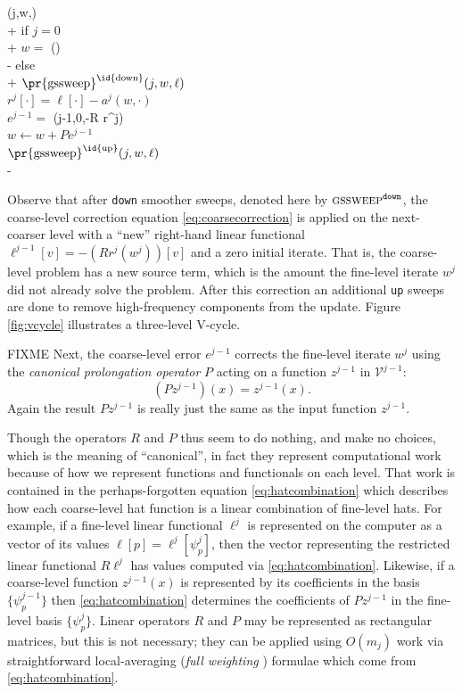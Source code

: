 \documentclass[letterpaper,final,12pt,reqno]{amsart}
\theoremstyle{claim}
\numberwithin{equation}{section}
\numberwithin{figure}{section}
\numberwithin{table}{section}
\begin{document}
\begin{pseudo*}
(j,w,\ell)\text{:} \\+
    if $j=0$ \\+
        $w =$ (\ell) \\-  %
    else \\+
        $\text{\pr{gssweep}}^{\text{\id{down}}}(j,w,\ell)$ \\
        $r^j[\cdot] = \ell[\cdot] - a^j(w,\cdot)$ \\
        $e^{j-1} =$ (j-1,0,-R r^j) \\
        $w \gets w + P e^{j-1}$ \\
        $\text{\pr{gssweep}}^{\text{\id{up}}}(j,w,\ell)$ \\-
\end{pseudo*}

Observe that after \texttt{down} smoother sweeps, denoted here by $\text{\textsc{gssweep}}^{\text{\texttt{down}}}$, the coarse-level correction equation \eqref{eq:coarsecorrection} is applied on the next-coarser level with a ``new'' right-hand linear functional $\ell^{j-1}[v]=-(R r^j(w^j))[v]$ and a zero initial iterate.  That is, the coarse-level problem has a new source term, which is the amount the fine-level iterate $w^j$ did not already solve the problem.  After this correction an additional \texttt{up} sweeps are done to remove high-frequency components from the update.  Figure \ref{fig:vcycle} illustrates a three-level V-cycle.

FIXME Next, the coarse-level error $e^{j-1}$ corrects the fine-level iterate $w^j$ using the \emph{canonical prolongation operator} $P$ acting on a function $z^{j-1}$ in $\mathcal{V}^{j-1}$:
\begin{equation}
  (P z^{j-1})(x) = z^{j-1}(x). \label{eq:canonicalprolongation}
\end{equation}
Again the result $P z^{j-1}$ is really just the same as the input function $z^{j-1}$.

Though the operators $R$ and $P$ thus seem to do nothing, and make no choices, which is the meaning of ``canonical'', in fact they represent computational work because of how we represent functions and functionals on each level.  That work is contained in the perhaps-forgotten equation \eqref{eq:hatcombination} which describes how each coarse-level hat function is a linear combination of fine-level hats.  For example, if a fine-level linear functional $\ell^j$ is represented on the computer as a vector of its values $\ell[p] = \ell^j[\psi_p^j]$, then the vector representing the restricted linear functional $R \ell^j$ has values computed via \eqref{eq:hatcombination}.  Likewise, if a coarse-level function $z^{j-1}(x)$ is represented by its coefficients in the basis $\{\psi_p^{j-1}\}$ then \eqref{eq:hatcombination} determines the coefficients of $P z^{j-1}$ in the fine-level basis $\{\psi_p^j\}$.  Linear operators $R$ and $P$ may be represented as rectangular matrices, but this is not necessary; they can be applied using $O(m_j)$ work via straightforward local-averaging (\emph{full weighting} \cite{Briggsetal2000}) formulae which come from \eqref{eq:hatcombination}.
\end{document}
